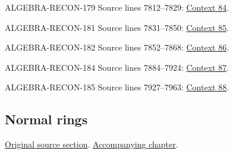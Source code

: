 \begin{AlgebraSourceRoutes}
\item[ALGEBRA-RECON-179] Source lines 7812--7829: \hyperlink{algebra-context-084}{Context 84}.
\item[ALGEBRA-RECON-181] Source lines 7831--7850: \hyperlink{algebra-context-085}{Context 85}.
\item[ALGEBRA-RECON-182] Source lines 7852--7868: \hyperlink{algebra-context-086}{Context 86}.
\item[ALGEBRA-RECON-184] Source lines 7884--7924: \hyperlink{algebra-context-087}{Context 87}.
\item[ALGEBRA-RECON-185] Source lines 7927--7963: \hyperlink{algebra-context-088}{Context 88}.
\end{AlgebraSourceRoutes}

\subsection{Normal rings}
\hypertarget{algebra-source-section-normal-rings}{}
\noindent\href{https://github.com/stacks/stacks-project/blob/a04446e57ec1fbc252a871afcec7752fb2807b14/algebra.tex\#L7971}{Original source section}. \href{algebra.pdf\#nameddest=section-normal-rings}{Accompanying chapter}.

